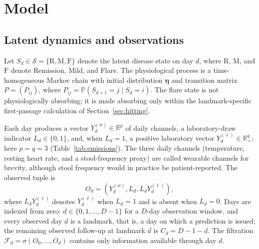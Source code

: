 \documentclass{ieeeaccess}
\newcommand{\R}{\mathrm{R}}
\newcommand{\M}{\mathrm{M}}
\newcommand{\F}{\mathrm{F}}
\newcommand{\vect}[1]{\bm{#1}}
\newcommand{\Prb}{\mathbb P}
\begin{document}
\section{Model}
\subsection{Latent dynamics and observations}
Let $S_d\in\mathcal S=\{\R,\M,\F\}$ denote the latent disease state on day $d$, where $\R$, $\M$, and $\F$ denote Remission, Mild, and Flare. The physiological process is a time-homogeneous Markov chain with initial distribution $\vect{\eta}$ and transition matrix $P=(P_{ij})$, where $P_{ij}=\Prb(S_{d+1}=j\mid S_d=i)$. The flare state is not physiologically absorbing; it is made absorbing only within the landmark-specific first-passage calculation of Section~\ref{sec:hitting}.

Each day produces a vector $Y_d^{(w)}\in\mathbb R^p$ of daily channels, a laboratory-draw indicator $L_d\in\{0,1\}$, and, when $L_d=1$, a positive laboratory vector $Y_d^{(\ell)}\in\mathbb R_+^q$; here $p=q=3$ (Table~\ref{tab:emissions}). The three daily channels (temperature, resting heart rate, and a stool-frequency proxy) are called wearable channels for brevity, although stool frequency would in practice be patient-reported. The observed tuple is
\begin{equation}
O_d=\left(Y_d^{(w)},L_d,L_dY_d^{(\ell)}\right),
\end{equation}
where $L_dY_d^{(\ell)}$ denotes $Y_d^{(\ell)}$ when $L_d=1$ and is absent when $L_d=0$.
Days are indexed from zero: $d\in\{0,1,\ldots,D-1\}$ for a $D$-day observation window, and every observed day $d$ is a landmark, that is, a day on which a prediction is issued; the remaining observed follow-up at landmark $d$ is $C_d=D-1-d$. The filtration $\mathcal F_d=\sigma(O_0,\ldots,O_d)$ contains only information available through day $d$.
\end{document}
